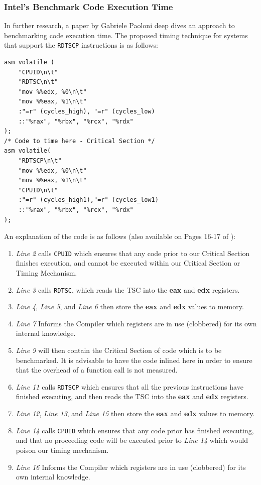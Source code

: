 \documentclass[bsc,frontabs,twoside,singlespacing,parskip,deptreport]{infthesis}     %
\begin{document}
\subsubsection{Intel's Benchmark Code Execution Time\cite{code_exec_times}}
In further research, a paper\cite{code_exec_times} by Gabriele Paoloni deep dives an approach to benchmarking code execution time. The proposed timing technique for systems that support the \texttt{RDTSCP} instructions is as follows:
\begin{verbatim}
asm volatile (
    "CPUID\n\t"
    "RDTSC\n\t"
    "mov %%edx, %0\n\t"
    "mov %%eax, %1\n\t"
    :"=r" (cycles_high), "=r" (cycles_low)
    ::"%rax", "%rbx", "%rcx", "%rdx"
);
/* Code to time here - Critical Section */
asm volatile(
    "RDTSCP\n\t"
    "mov %%edx, %0\n\t"
    "mov %%eax, %1\n\t"
    "CPUID\n\t"
    :"=r" (cycles_high1),"=r" (cycles_low1)
    ::"%rax", "%rbx", "%rcx", "%rdx"
);
\end{verbatim}
An explanation of the code is as follows (also available on Pages 16-17 of \cite{code_exec_times}):
\begin{enumerate}
    \item \textit{Line 2} calls \texttt{CPUID} which ensures that any code prior to our Critical Section finishes execution, and cannot be executed within our Critical Section or Timing Mechanism.
    \item \textit{Line 3} calls \texttt{RDTSC}, which reads the TSC into the \textbf{eax} and \textbf{edx} registers.
    \item \textit{Line 4}, \textit{Line 5}, and \textit{Line 6} then store the \textbf{eax} and \textbf{edx} values to memory.
    \item \textit{Line 7} Informs the Compiler which registers are in use (clobbered) for its own internal knowledge.
    \item \textit{Line 9} will then contain the Critical Section of code which is to be benchmarked. It is advisable to have the code inlined here in order to ensure that the overhead of a function call is not measured.
    \item \textit{Line 11} calls \texttt{RDTSCP} which ensures that all the previous instructions have finished executing, and then reads the TSC into the \textbf{eax} and \textbf{edx} registers.
    \item \textit{Line 12}, \textit{Line 13}, and \textit{Line 15} then store the \textbf{eax} and \textbf{edx} values to memory.
    \item \textit{Line 14} calls \texttt{CPUID} which ensures that any code prior has finished executing, and that no proceeding code will be executed prior to \textit{Line 14} which would poison our timing mechanism.
    \item \textit{Line 16} Informs the Compiler which registers are in use (clobbered) for its own internal knowledge.
\end{enumerate}
\end{document}
